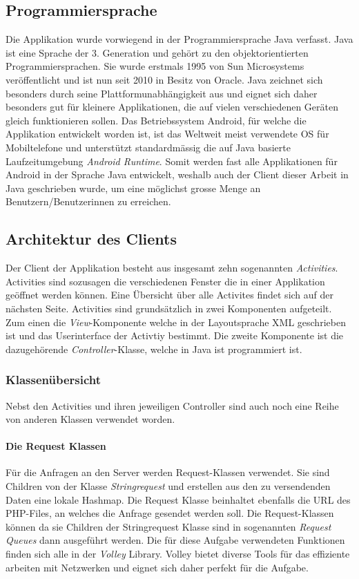 \documentclass[a4paper,11pt]{report}
\begin{document}
			\subsection{Programmiersprache}
			Die Applikation wurde vorwiegend in der Programmiersprache Java verfasst. Java ist eine Sprache der 3. Generation und gehört zu den objektorientierten Programmiersprachen. Sie wurde erstmals 1995 von Sun Microsystems veröffentlicht und ist nun seit 2010 in Besitz von Oracle. Java zeichnet sich besonders durch seine Plattformunabhängigkeit aus und eignet sich daher besonders gut für kleinere Applikationen, die auf vielen verschiedenen Geräten gleich funktionieren sollen. Das Betriebssystem Android, für welche die Applikation entwickelt worden ist, ist das Weltweit meist verwendete OS für Mobiltelefone und unterstützt standardmässig die auf Java basierte Laufzeitumgebung \emph{Android Runtime}. Somit werden fast alle Applikationen für Android in der Sprache Java entwickelt, weshalb auch der Client dieser Arbeit in Java geschrieben wurde, um eine möglichst grosse Menge an Benutzern/Benutzerinnen zu erreichen.\cite{android}
			\subsection{Architektur des Clients}
			Der Client der Applikation besteht aus insgesamt zehn sogenannten \emph{Activities}. Activities sind sozusagen die verschiedenen Fenster die in einer Applikation geöffnet werden können. Eine Übersicht über alle Activites findet sich auf der nächsten Seite. Activities sind grundsätzlich in zwei Komponenten aufgeteilt. Zum einen die \emph{View}-Komponente welche in der Layoutsprache XML geschrieben ist und das Userinterface der Activtiy bestimmt. Die zweite Komponente ist die dazugehörende \emph{Controller}-Klasse, welche in Java ist programmiert ist.
				
				\subsubsection{Klassenübersicht}
				Nebst den Activities und ihren jeweiligen Controller sind auch noch eine Reihe von anderen Klassen verwendet worden.
				\paragraph{Die Request Klassen}
				Für die Anfragen an den Server werden Request-Klassen verwendet. Sie sind Children von der Klasse \emph{Stringrequest} und erstellen aus den zu versendenden Daten eine lokale Hashmap. Die Request Klasse beinhaltet ebenfalls die URL des PHP-Files, an welches die Anfrage gesendet werden soll. Die Request-Klassen können da sie Children der Stringrequest Klasse sind in sogenannten \emph{Request Queues} dann ausgeführt werden. Die für diese Aufgabe verwendeten Funktionen finden sich alle in der \emph{Volley} Library. Volley bietet diverse Tools für das effiziente arbeiten mit Netzwerken und eignet sich daher perfekt für die Aufgabe.\cite{volley}
\end{document}
